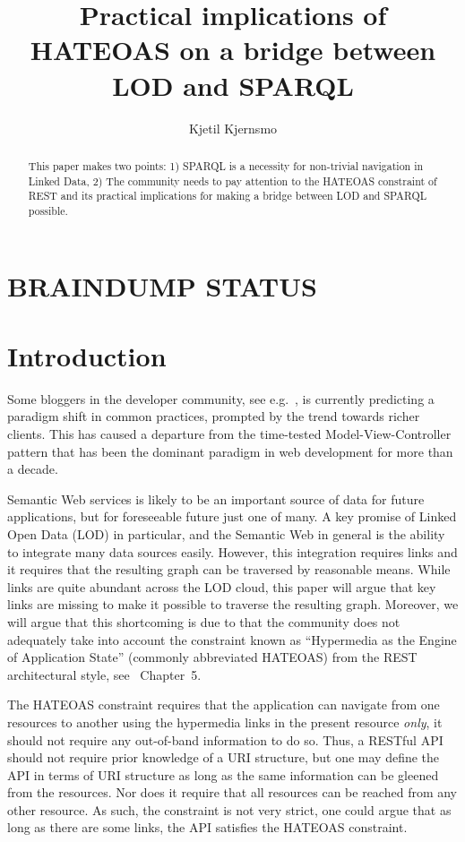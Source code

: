 \documentclass{llncs}
\title{Practical implications of HATEOAS on a bridge between LOD and SPARQL}
\author{Kjetil Kjernsmo\inst{1}}
\institute{Department of Informatics,
Postboks 1080 Blindern,
0316 Oslo, Norway
\email{kjekje@ifi.uio.no}}
\begin{document}
\maketitle



\begin{abstract}
This paper makes two points: 1) SPARQL is a necessity for non-trivial
navigation in Linked Data, 2) The community needs to pay attention to
the HATEOAS constraint of REST and its practical implications for
making a bridge between LOD and SPARQL possible.


\end{abstract}

\section*{BRAINDUMP STATUS}

\section{Introduction}

Some bloggers in the developer community, see e.g.~\cite{sunsetonmvc},
is currently predicting a paradigm shift in common practices, prompted
by the trend towards richer clients. This has caused a departure from
the time-tested Model-View-Controller pattern that has been the
dominant paradigm in web development for more than a decade.

Semantic Web services is likely to be an important source of data for
future applications, but for foreseeable future just one of many. A
key promise of Linked Open Data (LOD) in particular, and the Semantic
Web in general is the ability to integrate many data sources
easily. However, this integration requires links and it requires that
the resulting graph can be traversed by reasonable means. While links
are quite abundant across the LOD cloud, this paper will argue that
key links are missing to make it possible to traverse the resulting
graph. Moreover, we will argue that this shortcoming is due to that
the community does not adequately take into account the constraint
known as ``Hypermedia as the Engine of Application State'' (commonly
abbreviated HATEOAS) from the REST architectural style, see
\cite{fielding}~Chapter~5.

The HATEOAS constraint requires that the application can navigate from
one resources to another using the hypermedia links in the present
resource \emph{only}, it should not require any out-of-band
information to do so. Thus, a RESTful API should not require prior
knowledge of a URI structure, but one may define the API in terms of
URI structure as long as the same information can be gleened from the
resources. Nor does it require that all resources can be reached from
any other resource. As such, the constraint is not very strict, one
could argue that as long as there are some links, the API satisfies
the HATEOAS constraint.
\end{document}
